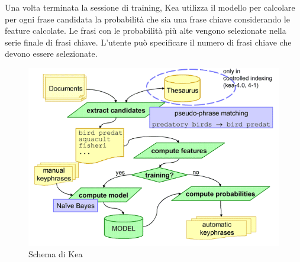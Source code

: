 Una volta terminata la sessione di training, Kea utilizza il modello per calcolare per ogni frase candidata la probabilità che sia una frase chiave considerando le feature calcolate. Le frasi con le probabilità più alte vengono selezionate nella serie finale di frasi chiave. L'utente può specificare il numero di frasi chiave che devono essere selezionate\cite{kea}.

\begin{figure}[H]
\centering
\includegraphics[scale=1]{res/kea_diagram.png}
\caption{Schema di Kea}
\label{fig:kea}
\end{figure}

